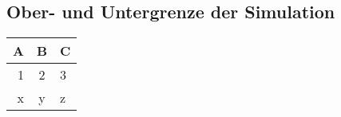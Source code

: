%

\subsection{Ober- und Untergrenze der Simulation}\label{subsec:lower-upper-bound}

\begin{tabular}{r|c|l}
    A & B & C                   \\\hline
    1 & 2 & 3                   \\\hline
    x & y & \cellcolor{red!25}z
\end{tabular}
